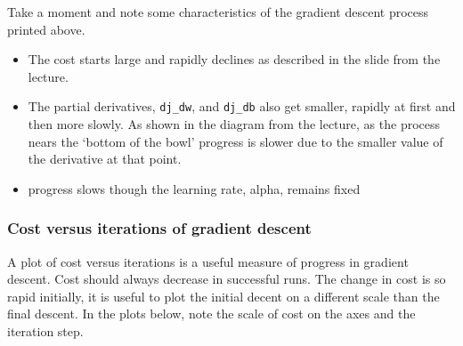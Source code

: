 \documentclass[11pt]{article}
\providecommand{\tightlist}{%
      \setlength{\itemsep}{0pt}\setlength{\parskip}{0pt}}
\begin{document}
    Take a moment and note some characteristics of the gradient descent
process printed above.

\begin{itemize}
\tightlist
\item
  The cost starts large and rapidly declines as described in the slide
  from the lecture.
\item
  The partial derivatives, \texttt{dj\_dw}, and \texttt{dj\_db} also get
  smaller, rapidly at first and then more slowly. As shown in the
  diagram from the lecture, as the process nears the `bottom of the
  bowl' progress is slower due to the smaller value of the derivative at
  that point.
\item
  progress slows though the learning rate, alpha, remains fixed
\end{itemize}

    \hypertarget{cost-versus-iterations-of-gradient-descent}{%
\subsubsection{Cost versus iterations of gradient
descent}\label{cost-versus-iterations-of-gradient-descent}}

A plot of cost versus iterations is a useful measure of progress in
gradient descent. Cost should always decrease in successful runs. The
change in cost is so rapid initially, it is useful to plot the initial
decent on a different scale than the final descent. In the plots below,
note the scale of cost on the axes and the iteration step.
\end{document}
